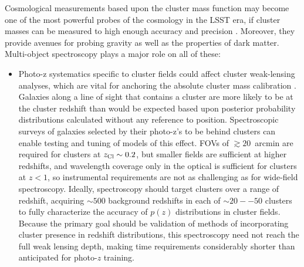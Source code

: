 Cosmological measurements based upon the cluster mass function may become one of the most powerful probes of the cosmology in the LSST era, if cluster masses can be measured to high enough accuracy and precision \cite{visions,Krause}.  Moreover, they provide avenues for probing gravity as well as the properties of dark matter.  Multi-object spectroscopy plays a major role on all of these:

\begin{itemize}
\item Photo-z systematics specific to cluster fields could affect cluster weak-lensing analyses, which are vital for anchoring the absolute cluster mass calibration \cite{Applegate}.  Galaxies along a line of sight that contains a cluster are more likely to be at the cluster redshift than would be expected based upon posterior probability distributions calculated without any reference to position.  %
Spectroscopic surveys of galaxies selected by their photo-z's to be behind clusters can enable testing and tuning of models of this effect.  FOVs of $\gtrsim 20$~arcmin are required for clusters at $z_{\rm Cl}\sim 0.2$, but smaller fields are sufficient at higher redshifts, and wavelength coverage only in the optical is sufficient for clusters at $z<1$, so instrumental requirements are not as challenging as for wide-field spectroscopy.  
Ideally, spectroscopy should target clusters over a range of redshift, acquiring $\sim 500$ background redshifts in each of  $\sim 20--50$ clusters to fully characterize the accuracy of $p(z)$ distributions in cluster fields.  Because the primary goal should be validation of methods of incorporating cluster presence in redshift distributions, this spectroscopy need not reach the full weak lensing depth, making time requirements considerably shorter than anticipated for photo-$z$ training.


\end{itemize}
